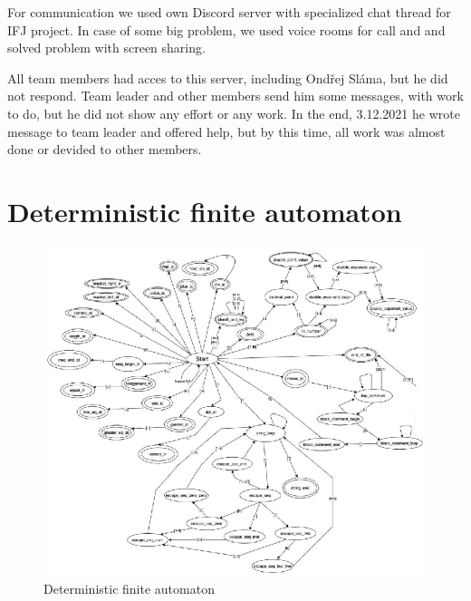 \documentclass[11pt]{article}
\begin{document}
For communication we used own Discord server with specialized chat thread for IFJ project. In case of some big problem, we used voice rooms for call and
and solved problem with screen sharing.

All team members had acces to this server, including Ondřej Sláma, but he did not respond. Team leader and other members send him some messages, with work to do, but he did not 
show any effort or any work. In the end, 3.12.2021 he wrote message to team leader and offered help, but by this time, all work was almost done or devided to 
other members. 

\newpage
\section{Deterministic finite automaton}
\begin{figure}[ht]
    \centering
    \includegraphics[width=0.95\linewidth]{finite_lexical_automat.eps}
    \caption{Deterministic finite automaton}
    \label{lexical_automat}
\end{figure}

\newpage
\end{document}
